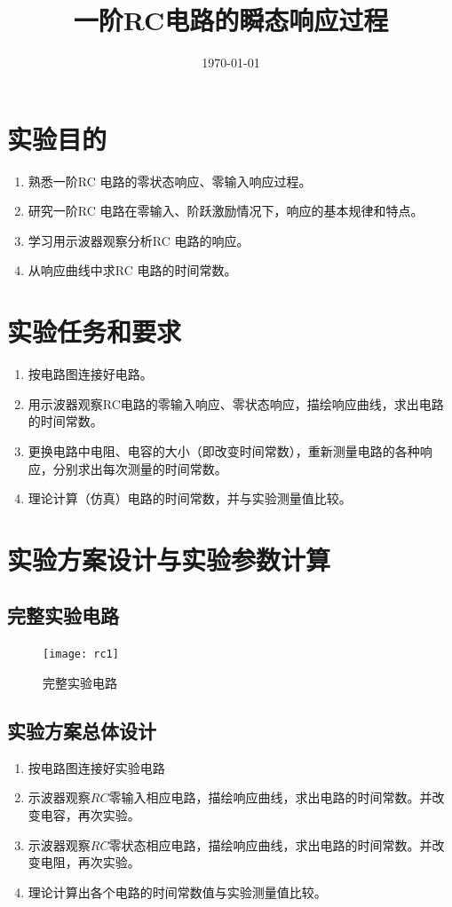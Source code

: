 \documentclass{../source/Experiment}
\title{一阶RC电路的瞬态响应过程}
\date{\today}
\begin{document}
    \makecover
    \makeheader

    \section{实验目的}
        \begin{enumerate}
            \item 熟悉一阶RC 电路的零状态响应、零输入响应过程。
            \item 研究一阶RC 电路在零输入、阶跃激励情况下，响应的基本规律和特点。
            \item 学习用示波器观察分析RC 电路的响应。
            \item 从响应曲线中求RC 电路的时间常数。
        \end{enumerate}
    \section{实验任务和要求}
        \begin{enumerate}
            \item 按电路图连接好电路。
            \item 用示波器观察RC电路的零输入响应、零状态响应，描绘响应曲线，求出电路的时间常数。
            \item 更换电路中电阻、电容的大小（即改变时间常数），重新测量电路的各种响应，分别求出每次测量的时间常数。
            \item 理论计算（仿真）电路的时间常数，并与实验测量值比较。
        \end{enumerate}
    \section{实验方案设计与实验参数计算}
        \subsection{完整实验电路}
            \begin{figure}[htbp]
                \centering
                \texttt{[image: rc1]}
                \caption{完整实验电路}
            \end{figure}
        \subsection{实验方案总体设计}
            \begin{enumerate}
                \item 按电路图连接好实验电路
                \item 示波器观察$RC$零输入相应电路，描绘响应曲线，求出电路的时间常数。并改变电容，再次实验。
                \item 示波器观察$RC$零状态相应电路，描绘响应曲线，求出电路的时间常数。并改变电阻，再次实验。
                \item 理论计算出各个电路的时间常数值与实验测量值比较。
            \end{enumerate}
\end{document}

